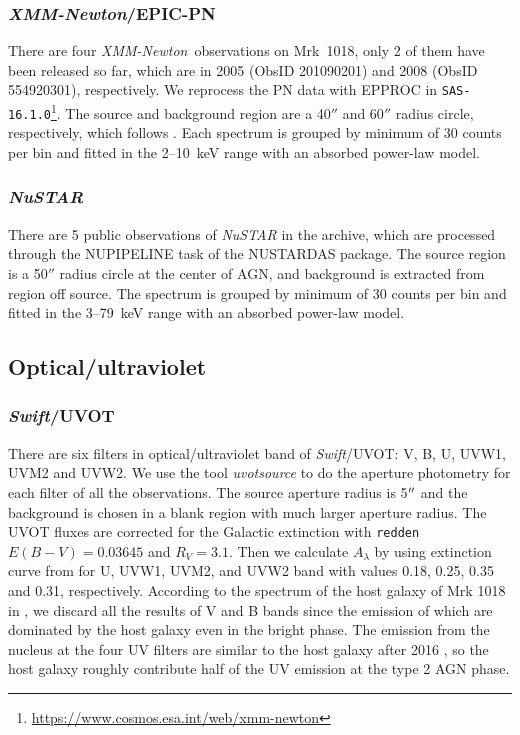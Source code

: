 \documentclass[twocolumn]{aastex63}
\newcommand{\xmm}{{\em XMM-Newton}}
\newcommand{\nustar}{{\em NuSTAR }}
\newcommand{\swift}{{\small \it Swift}}
\newcommand{\uvot}{{\small {\it Swift}/UVOT}}
\begin{document}
\subsubsection{\xmm/EPIC-PN}
There are four \xmm \, observations on Mrk~1018, only 2 of them have been released so far, which are in 2005 (ObsID 201090201) and 2008 (ObsID 554920301), respectively. We reprocess the PN data with {\scriptsize EPPROC} in \texttt{SAS-16.1.0}\footnote{\url{https://www.cosmos.esa.int/web/xmm-newton}}. The source and background region are a 40$''$ and 60$''$ radius circle, respectively, which follows \citet{2018MNRAS.480.3898N}. Each spectrum is grouped by minimum of 30 counts per bin and fitted in the 2--10~keV range with an absorbed power-law model. 



\subsubsection{\nustar}
There are 5 public observations of \nustar in the archive, which are processed through the {\scriptsize NUPIPELINE} task of the {\scriptsize NUSTARDAS} package. The source region is a 50$''$ radius circle at the center of AGN, and background is extracted from region off source. The spectrum is grouped by minimum of 30 counts per bin and fitted in the 3--79~keV range with an absorbed power-law model.


\subsection{Optical/ultraviolet}
\subsubsection{\swift/UVOT}
\label{sec:uvot}
There are six filters in optical/ultraviolet band of \uvot: V, B, U, UVW1, UVM2 and UVW2. We use the tool \textit{uvotsource} to do the aperture photometry for each filter of all the observations. The source aperture radius is 5$\mbox{$^{\prime\prime}$}$ and the background is chosen in a blank region with much larger aperture radius. The UVOT fluxes are corrected for the Galactic extinction with \texttt{redden} $E(B-V) = 0.03645$ \citep[see ][]{2018MNRAS.480.3898N} and $R_{V}=3.1$. Then we calculate  $A_{\lambda}$ by using extinction curve from \citet{2007ApJ...663..320F} for U, UVW1, UVM2, and 
UVW2 band with values 0.18, 0.25, 0.35 and 0.31, respectively. According to the spectrum of the host galaxy of Mrk 1018 in \citep{2018MNRAS.480.3898N}, we discard all the results of V and B bands since the emission of which are dominated by the host galaxy even in the bright phase. The emission from the nucleus at the four UV filters are similar to the host galaxy after 2016 \citep{2018MNRAS.480.3898N}, so the host galaxy roughly contribute half of the UV emission at the type 2 AGN phase. 
\end{document}
